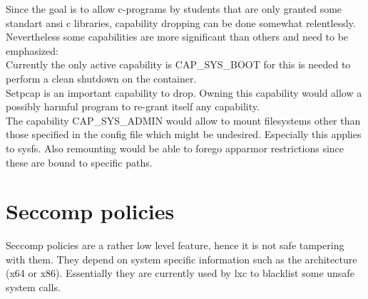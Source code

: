 Since the goal is to allow c-programs by students that are only granted some standart ansi c libraries, capability dropping can be
done somewhat relentlessly. Nevertheless some capabilities are more significant than others and need to be emphasized:\\
Currently the only active capability is CAP\_SYS\_BOOT for this is needed to perform a clean shutdown on the container.\\
Setpcap is an important capability to drop. Owning this capability would allow a possibly harmful program to re-grant itself any
capability\cite{kernelcaps}.\\
The capability CAP\_SYS\_ADMIN would allow to mount filesystems other than those specified in the config file which might be undesired.
Especially this applies to sysfs. Also remounting would be able to forego apparmor restrictions since these are bound to specific paths.\\


\section{Seccomp policies}

Seccomp policies are a rather low level feature, hence it is not safe tampering with them. They depend on system specific information such
as the architecture (x64 or x86). Essentially they are currently used by lxc to blacklist some unsafe system calls.